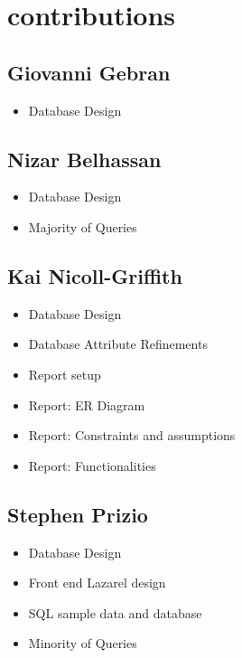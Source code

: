 \documentclass[11pt,letterpaper]{article}
\begin{document}
\section{contributions}
\subsection{Giovanni Gebran}
 \begin{itemize}
\item Database Design
\end{itemize}
\subsection{Nizar Belhassan}
 \begin{itemize}
\item Database Design
\item Majority of Queries
\end{itemize}
\subsection{Kai Nicoll-Griffith}
 \begin{itemize}
\item Database Design
\item Database Attribute Refinements
\item Report setup 
\item Report: ER Diagram
\item Report: Constraints and assumptions
\item Report: Functionalities
\end{itemize}
\subsection{Stephen Prizio}
 \begin{itemize}
	\item Database Design
	\item Front end Lazarel design
	\item SQL sample data and database 
	\item Minority of Queries
\end{itemize}
\end{document}
